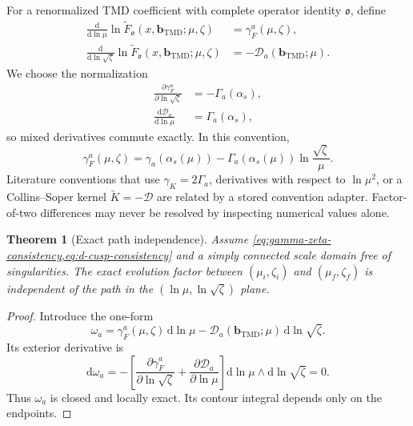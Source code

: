 \documentclass[11pt]{article}
\newtheorem{theorem}[definition]{Theorem}
\newcommand{\bM}{\bm{b}_{\mathrm{TMD}}}
\newcommand{\dd}{\mathrm{d}}
\newcommand{\cD}{\mathcal D}
\begin{document}
For a renormalized TMD coefficient with complete operator identity
\(\mathfrak o\), define
\begin{align}
 \frac{\dd}{\dd\ln\mu}
 \ln \widetilde F_{\mathfrak o}(x,\bM;\mu,\zeta)
 &=
 \gamma_F^{a}(\mu,\zeta),
 \label{eq:mu-evolution}\\
 \frac{\dd}{\dd\ln\sqrt\zeta}
 \ln \widetilde F_{\mathfrak o}(x,\bM;\mu,\zeta)
 &=
 -\cD_a(\bM;\mu).
 \label{eq:zeta-evolution}
\end{align}
We choose the normalization
\begin{align}
 \frac{\partial\gamma_F^a}{\partial\ln\sqrt\zeta}
 &=-\Gamma_a(\alpha_s),
 \label{eq:gamma-zeta-consistency}\\
 \frac{\dd\cD_a}{\dd\ln\mu}
 &=\Gamma_a(\alpha_s),
 \label{eq:d-cusp-consistency}
\end{align}
so mixed derivatives commute exactly.  In this convention,
\begin{equation}
 \gamma_F^a(\mu,\zeta)
 =\gamma_a(\alpha_s(\mu))
 -\Gamma_a(\alpha_s(\mu))
  \ln\frac{\sqrt\zeta}{\mu}.
 \label{eq:gamma-f-form}
\end{equation}
Literature conventions that use \(\gamma_K=2\Gamma_a\), derivatives with
respect to \(\ln\mu^2\), or a Collins--Soper kernel \(\widetilde K=-\cD\) are
related by a stored convention adapter.  Factor-of-two differences may never
be resolved by inspecting numerical values alone.

\begin{theorem}[Exact path independence]
Assume \cref{eq:gamma-zeta-consistency,eq:d-cusp-consistency} and a simply
connected scale domain free of singularities.  The exact evolution factor
between \((\mu_i,\zeta_i)\) and \((\mu_f,\zeta_f)\) is independent of the path
in the \((\ln\mu,\ln\sqrt\zeta)\) plane.
\end{theorem}

\begin{proof}
Introduce the one-form
\begin{equation}
 \omega_a
 =\gamma_F^a(\mu,\zeta)\,\dd\ln\mu
 -\cD_a(\bM;\mu)\,\dd\ln\sqrt\zeta.
 \label{eq:evolution-one-form}
\end{equation}
Its exterior derivative is
\begin{equation}
 \dd\omega_a
 =-
 \left[
 \frac{\partial\gamma_F^a}{\partial\ln\sqrt\zeta}
 +\frac{\partial\cD_a}{\partial\ln\mu}
 \right]
 \dd\ln\mu\wedge\dd\ln\sqrt\zeta=0.
 \label{eq:evolution-closed-form}
\end{equation}
Thus \(\omega_a\) is closed and locally exact.  Its contour integral depends
only on the endpoints.
\end{proof}
\end{document}
